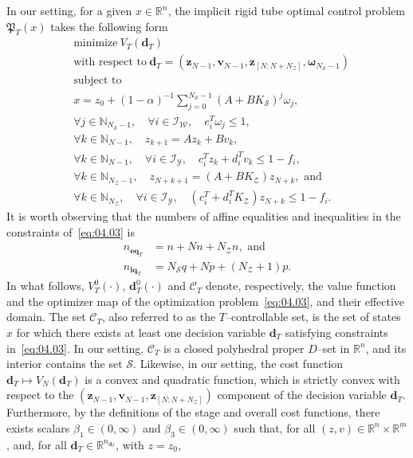 \documentclass[twocolumn]{autart}
\newcommand{\mb}[1]{\mathbb{#1}}
\newcommand{\mc}[1]{\mathcal{#1}}
\newcommand{\mbf}[1]{\mathbf{#1}}
\newcommand{\bb}{\left(\cdot\right)}
\newcommand{\N}{\mb{N}}
\newcommand{\R}{\mb{R}}
\numberwithin{equation}{section}
\begin{document}
In our setting, for a given $x\in\R^n$, the implicit rigid tube optimal control problem $\mathfrak{P}_T(x)$ takes the following form
\begin{align}
&\text{minimize}\ V_T(\mbf{d}_T)\nonumber\\
&\text{with respect to}\ \mbf{d}_T=(\mbf{z}_{N-1},\mbf{v}_{N-1},\mbf{z}_{[N:N+N_\mc{Z}]},\boldsymbol{\omega}_{N_\mc{S}-1})\nonumber\\
&\text{subject to}\nonumber\\
&x= z_0+ (1-\alpha)^{-1}\sum_{j=0}^{N_\mc{S}-1} (A+BK_\mc{S})^j\omega_j,\nonumber\\
&\forall j\in\N_{N_\mc{S}-1},\quad  \forall i\in\mc{I}_\mc{W},\quad e_i^T\omega_j\le 1,\nonumber\\
&\forall k\in\N_{N-1},\quad z_{k+1}=Az_k+Bv_k,\nonumber\\
&\forall k\in\N_{N-1},\quad  \forall i\in\mc{I}_\mc{Y},\quad  c_i^Tz_k+d_i^Tv_k\le 1-f_i,\nonumber\\
&\forall k\in\N_{N_\mc{Z}-1},\quad  z_{N+k+1}=(A+BK_\mc{Z})z_{N+k},\text{ and}\nonumber\\
\label{eq:04.03}
&\forall k\in\N_{N_\mc{Z}},\quad  \forall i\in\mc{I}_\mc{Y},\quad  (c_i^T+d_i^TK_\mc{Z})z_{N+k}\le 1-f_i.
\end{align}
It is worth observing that the numbers of affine equalities and inequalities in the constraints of~\eqref{eq:04.03} is
\begin{align}
\label{eq:04.04}
n_{\mbf{eq}_T}&=n+Nn+N_\mc{Z}n,\text{ and}\nonumber\\
n_{\mbf{iq}_T}&=N_\mc{S}q+Np+(N_\mc{Z}+1)p.
\end{align}
In what follows, $V_T^0\bb$, $\mbf{d}_T^0\bb$ and $\mc{C}_T$  denote, respectively, the value function and the optimizer map of the optimization problem~\eqref{eq:04.03}, and their effective domain.  The set $\mc{C}_T$, also referred to as the $T$--controllable set, is the set of states $x$ for which there exists at least one decision variable $\mbf{d}_T$ satisfying constraints in~\eqref{eq:04.03}. In our setting, $\mc{C}_T$ is a closed polyhedral proper $D$--set in $\R^n$, and its interior contains the set $\mc{S}$. Likewise, in our setting, the cost function $\mbf{d}_T\mapsto V_N(\mbf{d}_T)$ is a convex and quadratic function, which is strictly convex with respect to the $(\mbf{z}_{N-1},\mbf{v}_{N-1},\mbf{z}_{[N:N+N_\mc{Z}]})$ component of the decision variable $\mbf{d}_T$. Furthermore, by the definitions of the stage and overall cost functions, there exists scalars $\beta_1\in (0,\infty)$ and $\beta_3\in (0,\infty)$ such that, for all $(z,v)\in\R^n\times \R^m$, and, for all $\mbf{d}_T\in\R^{n_{\mbf{d}_T}}$, with $z=z_0$,
\end{document}
